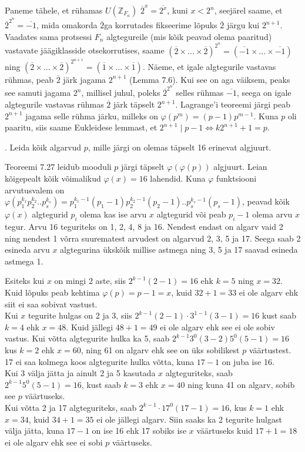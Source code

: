 \documentclass[a4paper, 10pt]{article}
\newcommand{\Z}{\mathbb{Z}}
\newcommand{\w}{\overline}
\begin{document}
\bigskip
Paneme tähele, et rühamas $U(\Z_{F_n})$ $\w{2}^x= \w{2^x}$, kuni $x<2^n$, seejärel saame, et $\w{2}^{2^n}= \w{-1} $, mida omakorda $\w{2}$ga korrutades fikseerime lõpuks $\w{2}$ järgu kui $2^{n+1}$. Vaadates sama protsessi $F_n$ algtegureile (mis kõik peavad olema paaritud) vastavate jäägiklasside otsekorrutises, saame $(\w{2}\times ... \times \w{2})^{2^{n}}=(\w{-1}\times ...\times \w{-1})$ ning $(\w{2}\times ... \times \w{2})^{2^{n+1}}=(\w{1}\times ...\times \w{1})$. Näeme, et igale algtegurile vastavas rühmas, peab $\w{2}$ järk jagama $2^{n+1}$ (Lemma 7.6). Kui see on aga väiksem, peaks see samuti jagama $2^{n}$, millisel juhul, poleks $\w{2}^{2^n}$ selles rühmas $\w{-1}$, seega on igale algtegurile vastavas rühmas $\w{2}$ järk täpselt $2^{n+1}$. Lagrange'i teoreemi järgi peab  $2^{n+1}$ jagama selle rühma järku, milleks on $\varphi(p^m)=(p-1)p^{m-1}$. Kuna $p$ oli paaritu, siis saame Eukleidese lemmast, et $2^{n+1}\mid p-1\Leftrightarrow k2^{n+1}+1=p$.


\bigskip
\pagebreak

. Leida kõik algarvud $p$, mille järgi on olemas täpselt 16 erinevat algjuurt. 

\bigskip
Teoreemi 7.27 leidub mooduli $p$ järgi täpselt $\varphi(\varphi(p))$ algjuurt. Leian kõigepealt kõik võimalikud $\varphi(x)=16$ lahendid. Kuna $\varphi$ funktsiooni arvutusvalem on $\varphi(p_1^{k_1}p_2^{k_2}..p_s^{k_s})=p_1^{k_1-1}(p_1-1)p_2^{k_2-1}(p_2-1)..p_s^{k_s-1}(p_s-1)$, peavad kõik $\varphi(x)$ algtegurid $p_i$ olema kas ise arvu $x$ algtegurid või peab $p_i-1$ olema arvu $x$ tegur. Arvu 16 teguriteks on 1, 2, 4, 8 ja 16. Nendest endast on algarv vaid 2 ning nendest 1 võrra suurematest arvudest on algarvud 2, 3, 5 ja 17. Seega saab 2 esineda arvu $x$ algtegurina ükskõik millise astmega ning 3, 5 ja 17 saavad esineda astmega 1.

Esiteks kui $x$ on mingi 2 aste, siis $2^{k-1}(2-1)=16$ ehk $k=5$ ning $x=32$. Kuid lõpuks peab kehtima $\varphi(p)=p-1=x$, kuid $32+1=33$ ei ole algarv ehk siit ei saa sobivat vastust.\\
Kui $x$ tegurite hulgas on 2 ja 3, siis $2^{k-1}(2-1)\cdot3^{1-1}(3-1)=16$ kust saab $k=4$ ehk $x=48$. Kuid jällegi $48+1=49$ ei ole algarv ehk see ei ole sobiv vastus. Kui võtta algtegurite hulka ka 5, saab $2^{k-1}3^0(3-2)5^0(5-1)=16$ kus $k=2$ ehk $x=60$, ning 61 on algarv ehk see on üks sobilikest $p$ väärtustest. 17 ei saa kolmega koos algtegurite hulka võtta, kuna $17-1$ on juba ise 16.\\
Kui 3 välja jätta ja ainult 2 ja 5 kasutada $x$ algteguriteks, saab $2^{k-1}5^0(5-1)=16$, kust saab $k=3$ ehk $x=40$ ning kuna 41 on algarv, sobib see $p$ väärtuseks.\\
Kui võtta 2 ja 17 algteguriteks, saab $2^{k-1}\cdot17^0(17-1)=16$, kus $k=1$ ehk $x=34$, kuid $34+1=35$ ei ole jällegi algarv. Siin saaks ka 2 tegurite hulgast välja jätta, kuna $17-1$ on ise 16 ehk 17 sobiks ise $x$ väärtuseks kuid $17+1=18$ ei ole algarv ehk see ei sobi $p$ väärtuseks.
\end{document}
